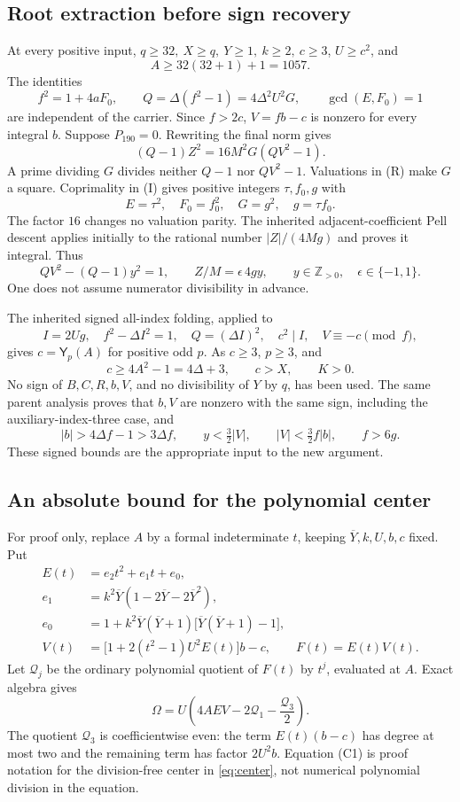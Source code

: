 \documentclass[11pt]{article}
\theoremstyle{remark}
\newcommand{\Zpos}{\mathbb Z_{>0}}
\newcommand{\yb}{\overline Y}
\newcommand{\PellY}{\mathsf Y}
\begin{document}
\subsection{Root extraction before sign recovery}
At every positive input, \(q\ge32,\ X\ge q,\ Y\ge1,\ k\ge2,\ c\ge3\),
\(U\ge c^2\), and
\[
 A\ge32(32+1)+1=1057.                              \tag{B0}
\]
The identities
\[
 f^2=1+4aF_0,\qquad
 Q=\Delta(f^2-1)=4\Delta^2U^2G,\qquad
 \gcd(E,F_0)=1                                    \tag{I}
\]
are independent of the carrier. Since \(f>2c\), \(V=fb-c\)
is nonzero for every integral \(b\).
Suppose \(P_{190}=0\). Rewriting the final norm gives
\[
 (Q-1)Z^2=16M^2G(QV^2-1).                         \tag{R}
\]
A prime dividing \(G\) divides neither \(Q-1\) nor \(QV^2-1\).
Valuations in (R) make \(G\) a square. Coprimality in (I)
gives positive integers \(\tau,f_0,g\) with
\[
 E=\tau^2,\quad F_0=f_0^2,\quad G=g^2,\quad g=\tau f_0. \tag{R1}
\]
The factor \(16\) changes no valuation parity.
The inherited adjacent-coefficient Pell descent applies initially to the
rational number \(|Z|/(4Mg)\) and proves it integral. Thus
\[
 QV^2-(Q-1)y^2=1,\qquad Z/M=\epsilon\,4gy,\qquad
 y\in\Zpos,\quad\epsilon\in\{-1,1\}.              \tag{R2}
\]
One does not assume numerator divisibility in advance.

The inherited signed all-index folding, applied to
\[
 I=2Ug,\quad f^2-\Delta I^2=1,\quad
 Q=(\Delta I)^2,\quad c^2\mid I,\quad V\equiv-c\pmod f,
\]
gives \(c=\PellY_p(A)\) for positive odd \(p\).
As \(c\ge3\), \(p\ge3\), and
\[
 c\ge4A^2-1=4\Delta+3,\qquad c>X,\qquad K>0.      \tag{R3}
\]
No sign of \(B,C,R,b,V\), and no divisibility of \(Y\) by \(q\), has
been used.
The same parent analysis proves that \(b,V\) are nonzero with the same
sign, including the auxiliary-index-three case, and
\[
 |b|>4\Delta f-1>3\Delta f,\qquad
 y<\tfrac32|V|,\qquad |V|<\tfrac32f|b|,\qquad f>6g. \tag{R4}
\]
These signed bounds are the appropriate input to the new argument.

\subsection{An absolute bound for the polynomial center}
For proof only, replace \(A\) by a formal indeterminate \(t\), keeping
\(\yb,k,U,b,c\) fixed. Put
\begin{align*}
 E(t)&=e_2t^2+e_1t+e_0,\\
 e_1&=k^2\yb(1-2\yb-2\yb^2),\\
 e_0&=1+k^2\yb(\yb+1)\bigl[\yb(\yb+1)-1\bigr],\\
 V(t)&=\bigl[1+2(t^2-1)U^2E(t)\bigr]b-c,\qquad
 F(t)=E(t)V(t).
\end{align*}
Let \(\mathcal Q_j\) be the ordinary polynomial quotient of \(F(t)\) by
\(t^j\), evaluated at \(A\). Exact algebra gives
\[
 \Omega=U\left(4AEV-2\mathcal Q_1-\frac{\mathcal Q_3}{2}\right).
 \tag{C1}
\]
The quotient \(\mathcal Q_3\) is coefficientwise even: the term
\(E(t)(b-c)\) has degree at most two and the remaining term has factor
\(2U^2b\). Equation (C1) is proof notation for the division-free center
in \eqref{eq:center}, not numerical polynomial division in the equation.
\end{document}
